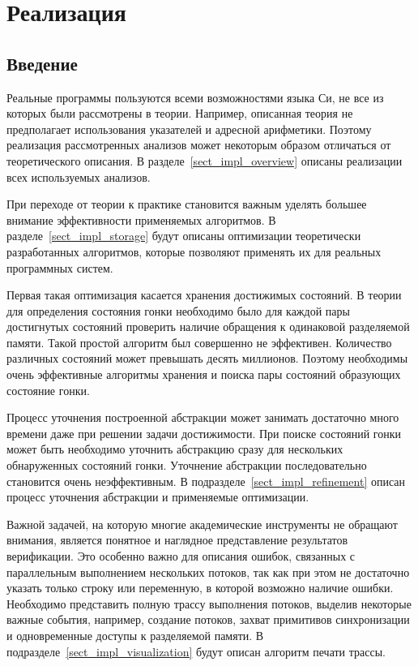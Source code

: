 \chapter{Реализация}
\label{chapter_implementation}

\section{Введение} \label{sect_impl_introduction}

Реальные программы пользуются всеми возможностями языка Си, не все из которых были рассмотрены в теории.
Например, описанная теория не предполагает использования указателей и адресной арифметики.
Поэтому реализация рассмотренных анализов может некоторым образом отличаться от теоретического описания.
В разделе~\ref{sect_impl_overview} описаны реализации всех используемых анализов.

При переходе от теории к практике становится важным уделять большее внимание эффективности применяемых алгоритмов.
В разделе~\ref{sect_impl_storage} будут описаны оптимизации теоретически разработанных алгоритмов, которые позволяют применять их для реальных программных систем. 

Первая такая оптимизация касается хранения достижимых состояний. В теории для определения состояния гонки необходимо было для каждой пары достигнутых состояний проверить наличие обращения к одинаковой разделяемой памяти.
Такой простой алгоритм был совершенно не эффективен. Количество различных состояний может превышать десять миллионов.
Поэтому необходимы очень эффективные алгоритмы хранения и поиска пары состояний образующих состояние гонки. 

Процесс уточнения построенной абстракции может занимать достаточно много времени даже при решении задачи достижимости.
При поиске состояний гонки может быть необходимо уточнить абстракцию сразу для нескольких обнаруженных состояний гонки.
Уточнение абстракции последовательно становится очень неэффективным. В подразделе~\ref{sect_impl_refinement} описан процесс уточнения абстракции и применяемые оптимизации.

Важной задачей, на которую многие академические инструменты не обращают внимания, является понятное и наглядное представление результатов верификации. Это особенно важно для описания ошибок, связанных с параллельным выполнением нескольких потоков, так как при этом не достаточно указать только строку или переменную, в которой возможно наличие ошибки. Необходимо представить полную трассу выполнения потоков, выделив некоторые важные события, например, создание потоков, захват примитивов синхронизации и одновременные доступы к разделяемой памяти. В подразделе~\ref{sect_impl_visualization} будут описан алгоритм печати трассы.


